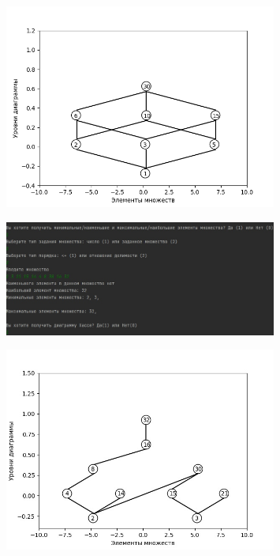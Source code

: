 \documentclass[bachelor, och, labwork]{shiza}
\begin{document}
        
        \begin{figure}[H]
            \centering
            \includegraphics[width=0.8\textwidth]{pic/3.png}
            \caption{}
        \end{figure}

        \begin{figure}[H]
            \centering
            \includegraphics[width=0.8\textwidth]{pic/4.png}
            \caption{}
        \end{figure}

        \begin{figure}[H]
            \centering
            \includegraphics[width=0.8\textwidth]{pic/5.png}
            \caption{}
        \end{figure}
\end{document}

